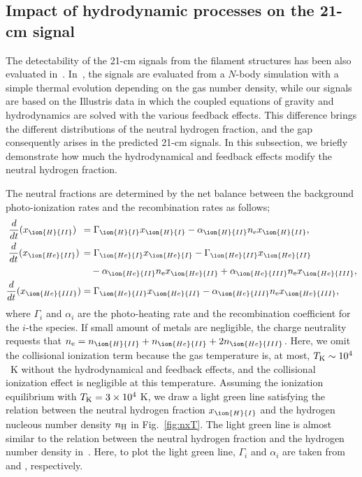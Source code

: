 \documentclass[a4paper,fleqn,usenatbib,useAMS]{mnras}
\begin{document}
\subsection{Impact of hydrodynamic processes on the 21-cm signal}\label{comparison}

The detectability of the 21-cm signals from the filament structures
has been also evaluated in~\citet{Takeuchi2014}.
In~\citet{Takeuchi2014}, the signals are evaluated from a $N$-body simulation with a simple
thermal evolution depending on the gas number density,
while our signals are based on the
Illustris data in which the coupled equations of gravity and
hydrodynamics are solved with the various feedback effects.  This
difference brings the different distributions of the neutral hydrogen
fraction, and the gap consequently arises in the predicted 21-cm
signals.  In this subsection, we briefly demonstrate how much
the hydrodynamical and feedback effects modify the neutral hydrogen fraction.

The neutral fractions are determined by the net balance between the background photo-ionization rates and the recombination rates as follows;  
\begin{align}
\frac{d}{dt}(x_{\ion{H}{II}})\,\,\,&=\Gamma_{\ion{H}{I}}x_{\ion{H}{I}}-\alpha_{\ion{H}{II}}
n_{\rm{e}}x_{\ion{H}{II}},
\\
\frac{d}{dt}(x_{\ion{He}{II}})\,&=\Gamma_{\ion{He}{I}}x_{\ion{He}{I}}-\Gamma_{\ion{He}{II}}
x_{\ion{He}{II}}\nonumber \\
&\,\,\,\,\,\,-\alpha_{\ion{He}{II}}n_{\rm{e}}x_{\ion{He}{II}}+\alpha_{\ion{He}{III}}n_{\rm{e}}
x_{\ion{He}{III}}, 
\\
\frac{d}{dt}(x_{\ion{He}{III}})&=\Gamma_{\ion{He}{II}}x_{\ion{He}{II}}-\alpha_{\ion{He}{III}}
n_{\rm{e}}x_{\ion{He}{III}}, 
\end{align}
where $\Gamma_{i}$ and $\alpha_{i}$ are the photo-heating rate and the recombination coefficient for the $i$-the species. 
If small amount of metals are negligible, the charge neutrality requests that $n_{\rm{e}}=n_{\ion{H}{II}}+n_{\ion{He}{II}}+2n_{\ion{He}{III}}$. 
Here, we omit the collisional ionization term because the gas temperature is, at most, $T_{\rm K}\sim 10^4$~K without the hydrodynamical and feedback effects, and the collisional ionization effect is negligible at this temperature.
Assuming the ionization equilibrium with $T_{\rm K} = 3 \times 10^4~$K,
we draw a light green line satisfying the relation between the neutral hydrogen fraction $x_{\ion{H}{I}}$ and the hydrogen nucleous number density $n_{\rm H}$ in Fig.~\ref{fig:nxT}. 
The light green line is almost similar to the relation between the neutral hydrogen
fraction and the hydrogen number density in~\citet{Takeuchi2014}. 
Here, to plot the light green line, 
$\Gamma_i$ and $\alpha_i$ are taken from \citet{HM2012} and \citet{FukugitaKawasaki1994}, respectively. 
\end{document}
